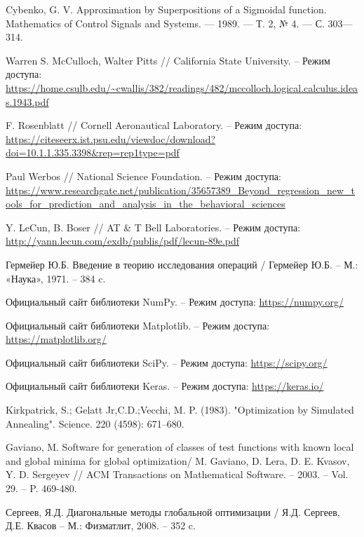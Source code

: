 \documentclass[11pt, oneside, a4paper]{article}
\begin{document}
\begin{biblio}

Cybenko, G. V. Approximation by Superpositions of a Sigmoidal function. Mathematics of Control Signals and Systems. — 1989. — Т. 2, № 4. — С. 303—314.

Warren S. McCulloch, Walter Pitts // California State University. – Режим доступа: \url{https://home.csulb.edu/~cwallis/382/readings/482/mccolloch.logical.calculus.ideas.1943.pdf}

F. Rosenblatt // Cornell Aeronautical Laboratory. – Режим доступа: \url{https://citeseerx.ist.psu.edu/viewdoc/download?doi=10.1.1.335.3398&rep=rep1type=pdf}

Paul Werbos // National Science Foundation. – Режим доступа: \url{https://www.researchgate.net/publication/35657389_Beyond_regression_new_tools_for_prediction_and_analysis_in_the_behavioral_sciences}

Y. LeCun, B. Boser // AT \& T  Bell Laboratories. – Режим доступа: \url{http://yann.lecun.com/exdb/publis/pdf/lecun-89e.pdf}

Гермейер Ю.Б. Введение в теорию исследования операций / Гермейер Ю.Б. – М.: «Наука», 1971. – 384 c.

Официальный сайт библиотеки NumPy. – Режим доступа: \url{https://numpy.org/}

Официальный сайт библиотеки Matplotlib. – Режим доступа: \url{https://matplotlib.org/}

Официальный сайт библиотеки SciPy. – Режим доступа: \url{https://scipy.org/}

Официальный сайт библиотеки Keras. – Режим доступа: \url{https://keras.io/}

Kirkpatrick, S.; Gelatt Jr,C.D.;Vecchi, M. P. (1983). "Optimization by Simulated Annealing". Science. 220 (4598): 671–680.

Gaviano, M. Software for generation of classes of test functions with known local and global minima for global optimization/ M. Gaviano, D. Lera, D. E. Kvasov, Y. D. Sergeyev // ACM Transactions on Mathematical Software. – 2003. – Vol.  29. – P. 469-480.

Сергеев, Я.Д. Диагональные методы глобальной оптимизации / Я.Д. Сергеев, Д.Е. Квасов – М.: Физматлит, 2008. – 352 c.

\end{biblio}
\end{document}
